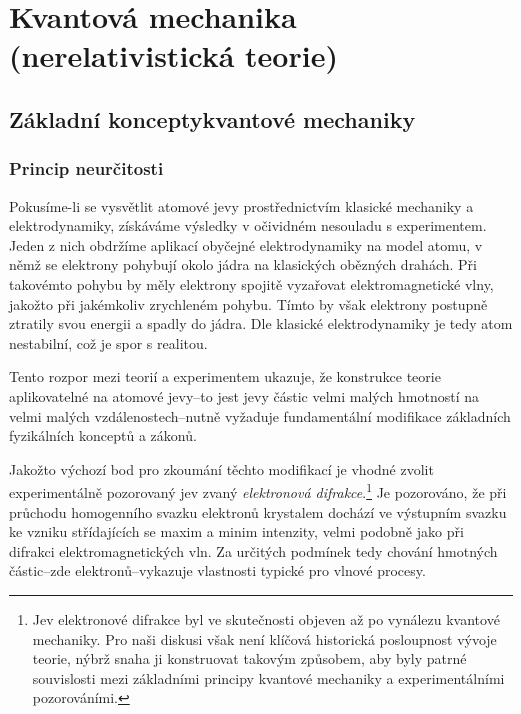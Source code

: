 \part{Kvantová mechanika (nerelativistická teorie)}
\localtableofcontents

\chapter[Základní koncepty kvantové mechaniky]{Základní koncepty\linebreak kvantové mechaniky}
\section{Princip neurčitosti}
Pokusíme-li se vysvětlit atomové jevy prostřednictvím klasické mechaniky a elektrodynamiky, získáváme výsledky v očividném nesouladu s experimentem. Jeden z nich obdržíme aplikací obyčejné elektrodynamiky na model atomu, v němž se elektrony pohybují okolo jádra na klasických obězných drahách. Při takovémto pohybu by měly elektrony spojitě vyzařovat elektromagnetické vlny, jakožto při jakémkoliv zrychleném pohybu. Tímto by však elektrony postupně ztratily svou energii a spadly do jádra. Dle klasické elektrodynamiky je tedy atom nestabilní, což je spor s realitou.\par
Tento rozpor mezi teorií a experimentem ukazuje, že konstrukce teorie aplikovatelné na atomové jevy--to jest jevy částic velmi malých hmotností na velmi malých vzdálenostech--nutně vyžaduje fundamentální modifikace základních fyzikálních konceptů a zákonů.\par
Jakožto výchozí bod pro zkoumání těchto modifikací je vhodné zvolit experimentálně pozorovaný jev zvaný \emph{elektronová difrakce}.\footnote{Jev elektronové difrakce byl ve skutečnosti objeven až po vynálezu kvantové mechaniky. Pro naši diskusi však není klíčová historická posloupnost vývoje teorie, nýbrž snaha ji konstruovat takovým způsobem, aby byly patrné souvislosti mezi základními principy kvantové mechaniky a experimentálními pozorováními.} Je pozorováno, že při průchodu homogenního svazku elektronů krystalem dochází ve výstupním svazku ke vzniku střídajících se maxim a minim intenzity, velmi podobně jako při difrakci elektromagnetických vln. Za určitých podmínek tedy chování hmotných částic--zde elektronů--vykazuje vlastnosti typické pro vlnové procesy.\par
